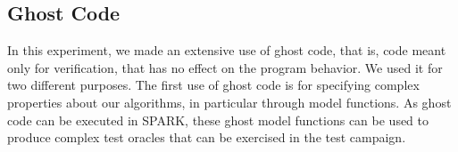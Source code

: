 \documentclass{llncs}
\newcommand{\gnatprove}{GNATprove\xspace}
\begin{document}
%
%
%

\subsection{Ghost Code}



In this experiment, we made an extensive use of ghost code, that is, code meant
only for verification, that has no effect on the program behavior. We used it
for two different purposes. The first use of ghost code is for specifying
complex properties about our algorithms, in particular through model
functions. As ghost code can be executed in SPARK, these ghost model functions
can be used to produce complex test oracles that can be exercised in the test campaign.
\end{document}

